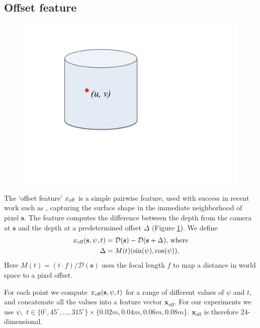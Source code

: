 \documentclass[10pt,twocolumn,letterpaper]{article}
\newcommand{\degree}{^{\circ}}
\newcommand{\feat}{\mathbf{x}}
\newcommand{\rgbdimage}{\mathcal{D}}
\newcommand{\pixelidx}{\mathbf{s}}
\begin{document}
\subsection{Offset feature}
\begin{figure}
  \vspace{-20pt}
  \centering
    \includegraphics[width=0.35\columnwidth, clip=true, trim=130 210 340 80, page=9]{spider_cobweb}
    \vspace{-10pt}
  \caption{}%
    \label{fig:offset_feature}
\end{figure}
The `offset feature' $x_\text{off}$ is a simple pairwise feature, used with success in recent work such as \cite{shotton-cvpr-2011}, capturing the surface shape in the immediate neighborhood of pixel $\pixelidx$.
The feature computes the difference between the depth from the camera at $\pixelidx$ and the depth at a predetermined offset $\Delta$ (Figure \ref{fig:offset_feature}). We define
\begin{align}
\scalfeat_\text{off} (\pixelidx, \psi, t) &= \rgbdimage(\pixelidx) - \rgbdimage(\pixelidx + \Delta), \, \text{where} \\
\Delta &= M(t) (\sin(\psi), \cos(\psi)).
\end{align}
Here $M(t) = (t\cdotp f)/\rgbdimage(\pixelidx)$ uses the focal length $f$ to map a distance in world space to a pixel offset. 

For each point we compute $\scalfeat_\text{off} (\pixelidx, \psi, t)$ for a range of different values of $\psi$ and $t$, and concatenate all the values into a feature vector $\feat_{\text{off}}$.
For our experiments we use $\psi, \,\, t \in \{0\degree, 45\degree, \ldots, 315\degree\} \times \{0.02m, 0.04m, 0.06m, 0.08m\}$.
$\feat_{\text{off}}$ is therefore 24-dimensional.

\end{document}

